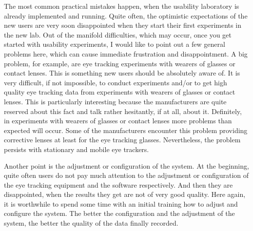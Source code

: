 \documentclass[output=paper]{langsci/langscibook}
\begin{document}
The most common practical mistakes happen, when the usability laboratory is already implemented and running. Quite often, the optimistic expectations of the new users are very soon disappointed when they start their first experiments in the new lab. Out of the manifold difficulties, which may occur, once you get started with usability experiments, I would like to point out a few general problems here, which can cause immediate frustration and disappointment. A big problem, for example, are eye tracking experiments with wearers of glasses or contact lenses. This is something new users should be absolutely aware of. It is very difficult, if not impossible, to conduct experiments and/or to get high quality eye tracking data from experiments with wearers of glasses or contact lenses. This is particularly interesting because the manufacturers are quite reserved about this fact and talk rather hesitantly, if at all, about it. Definitely, in experiments with wearers of glasses or contact lenses more problems than expected will occur. Some of the manufacturers encounter this problem providing corrective lenses at least for the eye tracking glasses. Nevertheless, the problem persists with stationary and mobile eye trackers.



Another point is the adjustment or configuration of the system. At the beginning, quite often users do not pay much attention to the adjustment or configuration of the eye tracking equipment and the software respectively. And then they are disappointed, when the results they get are not of very good quality. Here again, it is worthwhile to spend some time with an initial training how to adjust and configure the system. The better the configuration and the adjustment of the system, the better the quality of the data finally recorded.
\end{document}
